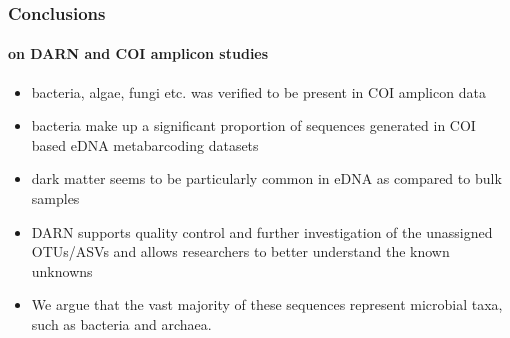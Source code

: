 \documentclass{beamer}
\begin{document}
   \begin{frame}
      \frametitle{Conclusions}
      \framesubtitle{on DARN and COI amplicon studies}
      \begin{itemize}
         \item \small bacteria, algae, fungi etc. was verified to be present in COI amplicon data
         \item \small bacteria make up a significant proportion of sequences generated in COI based eDNA metabarcoding datasets
         \item \small dark matter seems to be particularly common in eDNA as compared to bulk samples
         \item \small DARN supports quality control and further investigation of the unassigned OTUs/ASVs and
               \small allows researchers to better understand the known unknowns
         \item We argue that the vast majority of these sequences represent microbial taxa, such as bacteria and archaea.
      \end{itemize}

   \end{frame}



      
\end{document}
